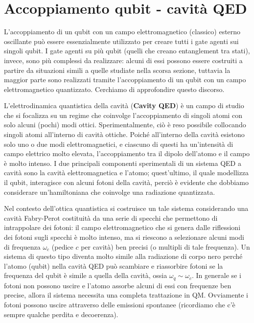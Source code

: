 \section{Accoppiamento qubit - cavità QED}\label{sec:int_qubit_CQED}
L'accoppiamento di un qubit con un campo elettromagnetico (classico) esterno oscillante può essere essenzialmente utilizzato per creare tutti i gate agenti sui singoli qubit. I gate agenti su più qubit (quelli che creano entanglement tra stati), invece, sono più complessi da realizzare: alcuni di essi possono essere costruiti a partire da situazioni simili a quelle studiate nella scorsa sezione, tuttavia la maggior parte sono realizzati tramite l'accoppiamento di un qubit con un campo elettromagnetico quantizzato. Cerchiamo di approfondire questo discorso. 

\noindent L'elettrodinamica quantistica della cavità (\textbf{Cavity QED}) è un campo di studio che si focalizza su un regime che coinvolge l'accoppiamento di singoli atomi con solo alcuni (pochi) modi ottici. Sperimentalmente, ciò è reso possibile collocando singoli atomi all'interno di cavità ottiche. Poiché all'interno della cavità esistono solo uno o due modi elettromagnetici, e ciascuno di questi ha un'intensità di campo elettrico molto elevata, l'accoppiamento tra il dipolo dell'atomo e il campo è molto intenso. I due principali componenti sperimentali di un sistema QED a cavità sono la cavità elettromagnetica e l'atomo; quest'ultimo, il quale modellizza il qubit, interagisce con alcuni fotoni della cavità, perciò è evidente che dobbiamo considerare un'hamiltoniana che coinvolge una radiazione quantizzata. 

\noindent Nel contesto dell'ottica quantistica si costruisce un tale sistema considerando una cavità Fabry-Perot costituità da una serie di specchi che permettono di intrappolare dei fotoni: il campo elettromagnetico che si genera dalle riflessioni dei fotoni sugli specchi è molto intenso, ma si riescono a selezionare alcuni modi di frequenza $\omega_c$ (pedice $c$ per cavità) ben precisi (o multipli di tale frequenza). Un sistema di questo tipo diventa molto simile alla radiazione di corpo nero perché l'atomo (qubit) nella cavità QED può scambiare e riassorbire fotoni se la frequenza del qubit è simile a quella della cavità, ossia $\omega_q \sim \omega_c$. In generale se i fotoni non possono uscire e l'atomo assorbe alcuni di essi con frequenze ben precise, allora il sistema necessita una completa trattazione in QM. Ovviamente i fotoni possono uscire attraverso delle emissioni spontanee (ricordiamo che c'è sempre qualche perdita e decoerenza).


